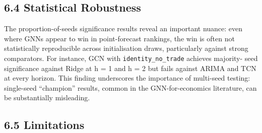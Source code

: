 \documentclass[
]{article}
\begin{document}
\subsection{6.4 Statistical Robustness}\label{statistical-robustness}

The proportion-of-seeds significance results reveal an important nuance:
even where GNNs appear to win in point-forecast rankings, the win is
often not statistically reproducible across initialisation draws,
particularly against strong comparators. For instance, GCN with
\texttt{identity\_no\_trade} achieves majority- seed significance
against Ridge at h = 1 and h = 2 but fails against ARIMA and TCN at
every horizon. This finding underscores the importance of multi-seed
testing: single-seed ``champion'' results, common in the
GNN-for-economics literature, can be substantially misleading.

\subsection{6.5 Limitations}\label{limitations}
\end{document}
